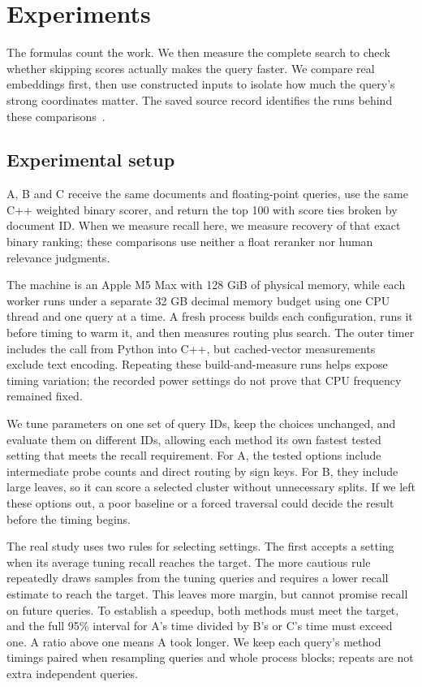 \section{Experiments}
\label{sec:experiments}
The formulas count the work. We then measure the complete search to check whether skipping
scores actually makes the query faster. We compare real embeddings first,
then use constructed inputs to isolate how much the query's strong coordinates matter.
The saved source record identifies the runs behind these comparisons~\cite{local}.

\subsection{Experimental setup}
A, B and C receive the same documents and floating-point queries, use the same C++
weighted binary scorer, and return the top 100 with score ties broken by document ID.
When we measure recall here, we measure recovery of that exact binary ranking; these
comparisons use neither a float reranker nor human relevance judgments.

The machine is an Apple M5 Max with 128 GiB of physical memory, while each worker runs
under a separate 32 GB decimal memory budget using one CPU thread and one query at a time.
A fresh process builds each configuration, runs it before timing to warm it, and then measures routing plus search.
The outer timer includes the call from Python into C++, but cached-vector measurements
exclude text encoding. Repeating these build-and-measure runs helps expose timing variation;
the recorded power settings do not prove that CPU frequency remained fixed.

We tune parameters on one set of query IDs, keep the choices unchanged, and evaluate them on different
IDs, allowing each method its own fastest tested setting that meets the recall requirement.
For A, the tested options include intermediate probe counts and direct routing by sign keys.
For B, they include large leaves, so it can score a selected cluster without unnecessary
splits. If we left these options out, a poor baseline or a forced traversal could decide
the result before the timing begins.

The real study uses two rules for selecting settings. The first accepts a setting when its
average tuning recall reaches the target. The more cautious rule repeatedly draws samples
from the tuning queries and requires a lower recall estimate to reach the target. This leaves
more margin, but cannot promise recall on future queries. To establish a speedup, both methods
must meet the target, and the full 95\% interval for A's time divided by B's or C's time must
exceed one. A ratio above one means A took longer. We keep each query's method timings paired
when resampling queries and whole process blocks; repeats are not extra independent queries.

